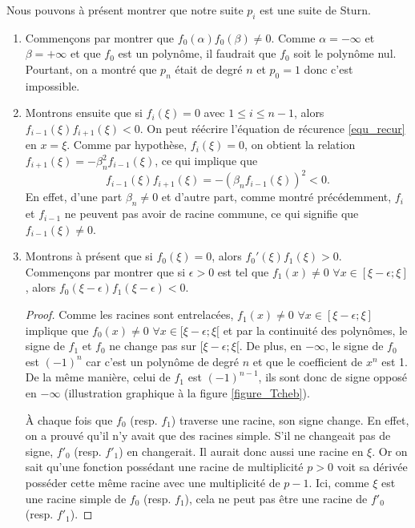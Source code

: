 	Nous pouvons à présent montrer que notre suite $p_i$ est une suite de Sturn.
\begin{enumerate}
  \item Commençons par montrer que $f_0(\alpha)f_0(\beta) \neq 0$.
    Comme $\alpha = -\infty$ et $\beta = + \infty$ et que $f_0$ est un polynôme,
    il faudrait que $f_0$ soit le polynôme nul.
    Pourtant, on a montré que $p_n$ était de degré $n$ et $p_0 = 1$ donc
    c'est impossible.
  \item Montrons ensuite que si $f_i(\xi) = 0$ avec $1 \leq i \leq n-1$,
    alors $f_{i-1}(\xi)f_{i+1}(\xi) < 0$.
    On peut réécrire l'équation de récurence \ref{equ_recur} en $x=\xi$.
    Comme par hypothèse, $f_i(\xi)=0$, on obtient la relation
    $f_{i+1}(\xi) = -\beta_n^2f_{i-1}(\xi)$, ce qui implique que
    \[ f_{i-1}(\xi)f_{i+1}(\xi) = -(\beta_nf_{i-1}(\xi))^2 < 0. \]
    En effet, d'une part $\beta_n \neq 0$ et d'autre part, comme montré précédemment, $f_i$ et $f_{i-1}$ ne peuvent
    pas avoir de racine commune, ce qui signifie que $f_{i-1}(\xi) \neq 0$.
  \item Montrons à présent que si $f_0(\xi) = 0$,
    alors $f_0'(\xi)f_1(\xi) > 0$.
    Commençons par montrer que si $\epsilon > 0$ est tel que
    $f_1(x) \neq 0$ $\forall x \in [\xi - \epsilon; \xi]$, alors
    $f_0(\xi-\epsilon) f_1(\xi-\epsilon) < 0$.

    \begin{proof}
      Comme les racines sont entrelacées,
      $f_1(x) \neq 0$ $\forall x \in [\xi - \epsilon; \xi]$ implique que
      $f_0(x) \neq 0$ $\forall x \in [\xi - \epsilon; \xi[$
      et par la continuité des polynômes, le signe de $f_1$ et $f_0$ ne change pas
      sur $[\xi - \epsilon; \xi[$.
      De plus, en $-\infty$,
      le signe de $f_0$ est $(-1)^n$ car c'est un polynôme de
      degré $n$ et que le coefficient de $x^n$ est 1.
      De la même manière, celui de $f_1$ est $(-1)^{n-1}$,
      ils sont donc de signe opposé en $-\infty$ (illustration graphique à la figure \ref{figure_Tcheb}).


      À chaque fois que $f_0$ (resp. $f_1$) traverse une racine, son signe change.
      En effet, on a prouvé qu'il n'y avait que des racines simple.
      S'il ne changeait pas de signe, $f'_0$ (resp. $f'_1$) en changerait.
      Il aurait donc aussi une racine en $\xi$.
      Or on sait qu'une fonction possédant une racine de multiplicité $p > 0$
      voit sa dérivée posséder cette même racine avec une multiplicité de $p-1$.
      Ici, comme $\xi$ est une racine simple de $f_0$ (resp. $f_1$),
      cela ne peut pas être une racine de $f'_0$ (resp. $f'_1$).


\end{proof}
\end{enumerate}
